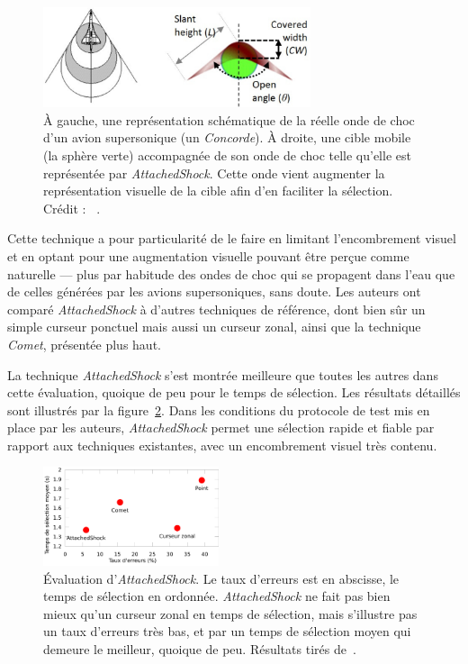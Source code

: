 	\begin{figure}[!htb]
		\centering
		\includegraphics[width=0.70\textwidth]{figures/ch2/asas}
		\caption[\emph{AttachedShock}, onde de choc]{À gauche, une représentation schématique de la réelle onde de choc d'un avion supersonique (un \emph{Concorde}). À droite, une cible mobile (la sphère verte) accompagnée de son onde de choc telle qu'elle est représentée par \emph{AttachedShock}. Cette onde vient augmenter la représentation visuelle de la cible afin d'en faciliter la sélection. Crédit : ~\cite{you2012attachedshock}.}
		\label{fig:asas}
	\end{figure}
	
	Cette technique a pour particularité de le faire en limitant l'encombrement visuel et en optant pour une augmentation visuelle pouvant être perçue comme \og naturelle \fg{} --- plus par habitude des ondes de choc qui se propagent dans l'eau que de celles générées par les avions supersoniques, sans doute. Les auteurs ont comparé \emph{AttachedShock} à d'autres techniques de référence, dont bien sûr un simple curseur ponctuel mais aussi un curseur zonal, ainsi que la technique \emph{Comet}, présentée plus haut.

	La technique \emph{AttachedShock} s'est montrée meilleure que toutes les autres dans cette évaluation, quoique de peu pour le temps de sélection. Les résultats détaillés sont illustrés par la figure~\ref{fig:asRes}. Dans les conditions du protocole de test mis en place par les auteurs, \emph{AttachedShock} permet une sélection rapide et fiable par rapport aux techniques existantes, avec un encombrement visuel très contenu.

	\begin{figure} %
		\centering
		\includegraphics[width=0.46\textwidth]{figures/ch2/asRes}
		\caption[\emph{AttachedShock}, performance]{Évaluation d'\emph{AttachedShock}. Le taux d'erreurs est en abscisse, le temps de sélection en ordonnée. \emph{AttachedShock} ne fait pas bien mieux qu'un curseur zonal en temps de sélection, mais s'illustre pas un taux d'erreurs très bas, et par un temps de sélection moyen qui demeure le meilleur, quoique de peu. Résultats tirés de~\cite{you2012attachedshock}.}
		\label{fig:asRes}
	\end{figure}
	
